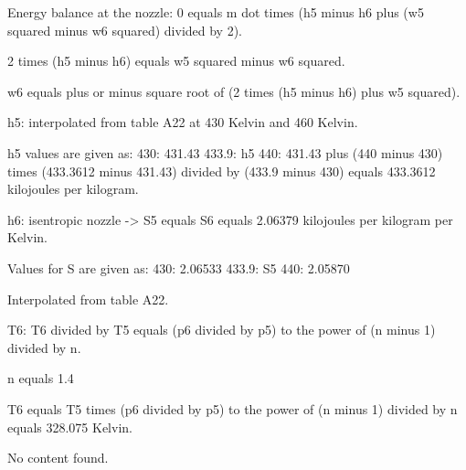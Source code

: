 Energy balance at the nozzle:
0 equals m dot times (h5 minus h6 plus (w5 squared minus w6 squared) divided by 2).

2 times (h5 minus h6) equals w5 squared minus w6 squared.

w6 equals plus or minus square root of (2 times (h5 minus h6) plus w5 squared).

h5: interpolated from table A22 at 430 Kelvin and 460 Kelvin.

h5 values are given as:
430: 431.43
433.9: h5
440: 431.43 plus (440 minus 430) times (433.3612 minus 431.43) divided by (433.9 minus 430) equals 433.3612 kilojoules per kilogram.

h6: isentropic nozzle -> S5 equals S6 equals 2.06379 kilojoules per kilogram per Kelvin.

Values for S are given as:
430: 2.06533
433.9: S5
440: 2.05870

Interpolated from table A22.

T6: T6 divided by T5 equals (p6 divided by p5) to the power of (n minus 1) divided by n.

n equals 1.4

T6 equals T5 times (p6 divided by p5) to the power of (n minus 1) divided by n equals 328.075 Kelvin.

No content found.